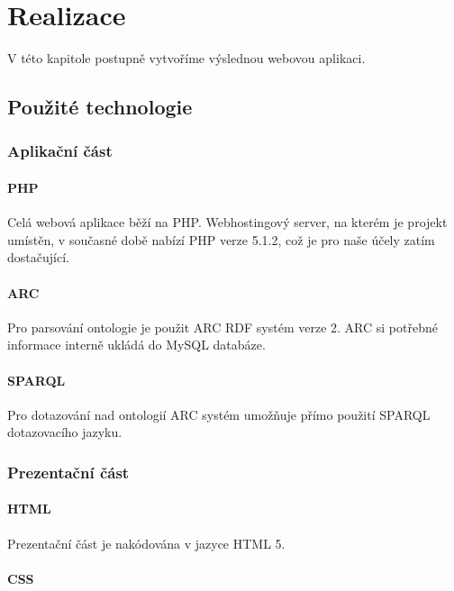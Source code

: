 \chapter{Realizace}
\label{chapter:implementation}

V této kapitole postupně vytvoříme výslednou webovou aplikaci.

\section{Použité technologie}

\subsection{Aplikační část}

\subsubsection{PHP}

Celá webová aplikace běží na PHP. Webhostingový server, na kterém je projekt umístěn, v současné době nabízí PHP verze 5.1.2, což je pro naše účely zatím dostačující. 

\subsubsection{ARC}

Pro parsování ontologie je použit ARC RDF systém verze 2. ARC si potřebné informace interně ukládá do MySQL databáze.

\subsubsection{SPARQL}

Pro dotazování nad ontologií ARC systém umožňuje přímo použití SPARQL dotazovacího jazyku.


\subsection{Prezentační část}

\subsubsection{HTML}

Prezentační část je nakódována v jazyce HTML 5.

\subsubsection{CSS}

